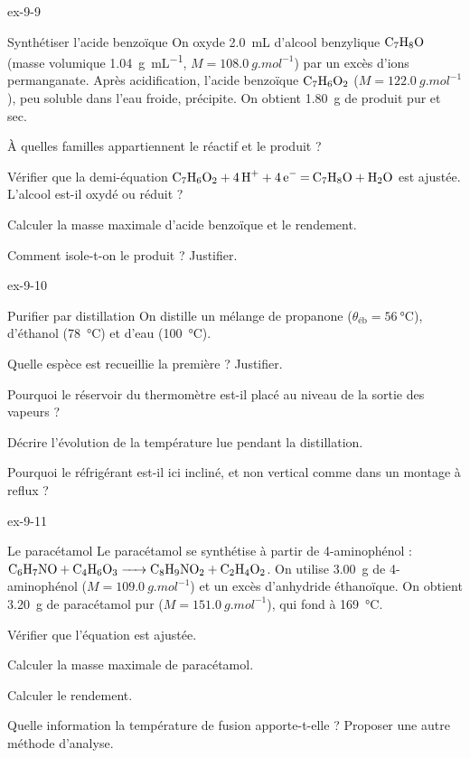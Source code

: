 \begin{blocLivre}{ex-9-9}
\begin{exercice}[2]{Synthétiser l'acide benzoïque}
On oxyde \qty{2,0}{mL} d'alcool benzylique $\ce{C7H8O}$ (masse volumique \qty{1,04}{g.mL^{-1}}, $M=\qty{108,0}{g.mol^{-1}}$) par un excès d'ions
permanganate. Après acidification, l'acide benzoïque $\ce{C7H6O2}$ ($M=\qty{122,0}{g.mol^{-1}}$), peu soluble dans l'eau froide, précipite.
On obtient \qty{1,80}{g} de produit pur et sec.
\begin{questions}
\item À quelles familles appartiennent le réactif et le produit ?
\item Vérifier que la demi-équation $\ce{C7H6O2 + 4H+ + 4e- = C7H8O + H2O}$ est ajustée. L'alcool est-il oxydé ou réduit ?
\item Calculer la masse maximale d'acide benzoïque et le rendement.
\item Comment isole-t-on le produit ? Justifier.
\end{questions}
\end{exercice}
\end{blocLivre}
\begin{blocLivre}{ex-9-10}
\begin{exercice}[2]{Purifier par distillation}
On distille un mélange de propanone ($\theta_\text{éb}=\qty{56}{\degreeCelsius}$), d'éthanol (\qty{78}{\degreeCelsius}) et d'eau (\qty{100}{\degreeCelsius}).
\begin{questions}
\item Quelle espèce est recueillie la première ? Justifier.
\item Pourquoi le réservoir du thermomètre est-il placé au niveau de la sortie des vapeurs ?
\item Décrire l'évolution de la température lue pendant la distillation.
\item Pourquoi le réfrigérant est-il ici incliné, et non vertical comme dans un montage à reflux ?
\end{questions}
\end{exercice}
\end{blocLivre}
\begin{blocLivre}{ex-9-11}
\begin{exercice}[2]{Le paracétamol}
Le paracétamol se synthétise à partir de 4-aminophénol : $\ce{C6H7NO + C4H6O3 -> C8H9NO2 + C2H4O2}$. On utilise \qty{3,00}{g} de 4-aminophénol
($M=\qty{109,0}{g.mol^{-1}}$) et un excès d'anhydride éthanoïque. On obtient \qty{3,20}{g} de paracétamol pur ($M=\qty{151,0}{g.mol^{-1}}$), qui fond à
\qty{169}{\degreeCelsius}.
\begin{questions}
\item Vérifier que l'équation est ajustée.
\item Calculer la masse maximale de paracétamol.
\item Calculer le rendement.
\item Quelle information la température de fusion apporte-t-elle ? Proposer une autre méthode d'analyse.
\end{questions}
\end{exercice}
\end{blocLivre}
